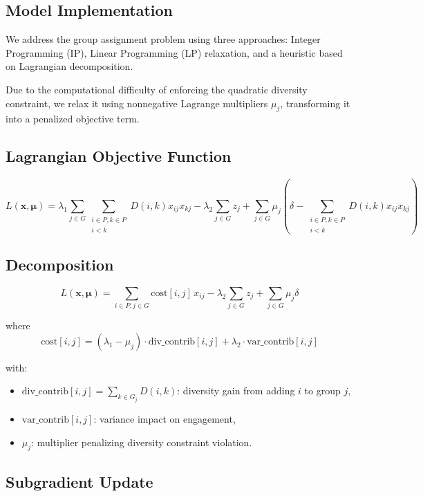 \subsection*{Model Implementation}

We address the group assignment problem using three approaches: Integer Programming (IP), Linear Programming (LP) relaxation, and a heuristic based on Lagrangian decomposition.

Due to the computational difficulty of enforcing the quadratic diversity constraint, we relax it using nonnegative Lagrange multipliers $\mu_j$, transforming it into a penalized objective term.

\subsection*{Lagrangian Objective Function}

\[
L(\mathbf{x}, \boldsymbol{\mu}) = \lambda_1 \sum_{j \in G} \sum_{\substack{i \in P, k \in P \\ i < k}} D(i,k) x_{ij} x_{kj} - \lambda_2 \sum_{j \in G} z_j + \sum_{j \in G} \mu_j \left( \delta - \sum_{\substack{i \in P, k \in P \\ i < k}} D(i,k) x_{ij} x_{kj} \right)
\]

\subsection*{Decomposition}

\[
L(\mathbf{x}, \boldsymbol{\mu}) = \sum_{i \in P, j \in G} \text{cost}[i,j] \, x_{ij} - \lambda_2 \sum_{j \in G} z_j + \sum_{j \in G} \mu_j \delta
\]

where
\[
\text{cost}[i,j] = (\lambda_1 - \mu_j) \cdot \text{div\_contrib}[i,j] + \lambda_2 \cdot \text{var\_contrib}[i,j]
\]

with:
\begin{itemize}
    \item $\text{div\_contrib}[i,j] = \sum_{k \in G_j} D(i,k)$: diversity gain from adding $i$ to group $j$,
    \item $\text{var\_contrib}[i,j]$: variance impact on engagement,
    \item $\mu_j$: multiplier penalizing diversity constraint violation.
\end{itemize}

\subsection*{Subgradient Update}

